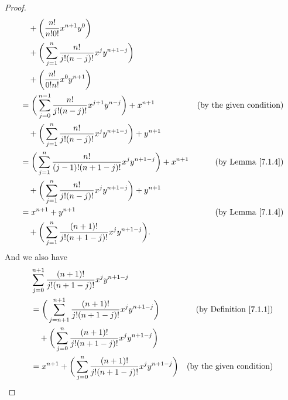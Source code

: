 \begin{proof}
\begin{align*}
                        & \quad + \bigg(\frac{n!}{n!0!} x^{n + 1} y^0\bigg)                                                                               \\
                        & \quad + \bigg(\sum_{j = 1}^n \frac{n!}{j!(n - j)!} x^j y^{n + 1 - j}\bigg)                                                      \\
                        & \quad + \bigg(\frac{n!}{0!n!} x^0 y^{n + 1}\bigg)                                                                               \\
                        & = \bigg(\sum_{j = 0}^{n - 1} \frac{n!}{j!(n - j)!} x^{j + 1} y^{n - j}\bigg) + x^{n + 1}   & \text{(by the given condition)}    \\
                        & \quad + \bigg(\sum_{j = 1}^n \frac{n!}{j!(n - j)!} x^j y^{n + 1 - j}\bigg) + y^{n + 1}                                          \\
                        & = \bigg(\sum_{j = 1}^n \frac{n!}{(j - 1)!(n + 1 - j)!} x^j y^{n + 1 - j}\bigg) + x^{n + 1} & \text{(by Lemma \ref{7.1.4})}      \\
                        & \quad + \bigg(\sum_{j = 1}^n \frac{n!}{j!(n - j)!} x^j y^{n + 1 - j}\bigg) + y^{n + 1}                                          \\
                        & = x^{n + 1} + y^{n + 1}                                                                    & \text{(by Lemma \ref{7.1.4})}      \\
                        & \quad + \bigg(\sum_{j = 1}^n \frac{(n + 1)!}{j!(n + 1 - j)!} x^j y^{n + 1 - j}\bigg).
    \end{align*}
    And we also have
    \begin{align*}
         & \sum_{j = 0}^{n + 1} \frac{(n + 1)!}{j!(n + 1 - j)!} x^j y^{n + 1 - j}                                                                       \\
         & = \bigg(\sum_{j = n + 1}^{n + 1} \frac{(n + 1)!}{j!(n + 1 - j)!} x^j y^{n + 1 - j}\bigg)                & \text{(by Definition \ref{7.1.1})} \\
         & \quad + \bigg(\sum_{j = 0}^n \frac{(n + 1)!}{j!(n + 1 - j)!} x^j y^{n + 1 - j}\bigg)                                                         \\
         & = x^{n + 1} + \bigg(\sum_{j = 0}^n \frac{(n + 1)!}{j!(n + 1 - j)!} x^j y^{n + 1 - j}\bigg)              & \text{(by the given condition)}    \\

\end{align*}
\end{proof}
